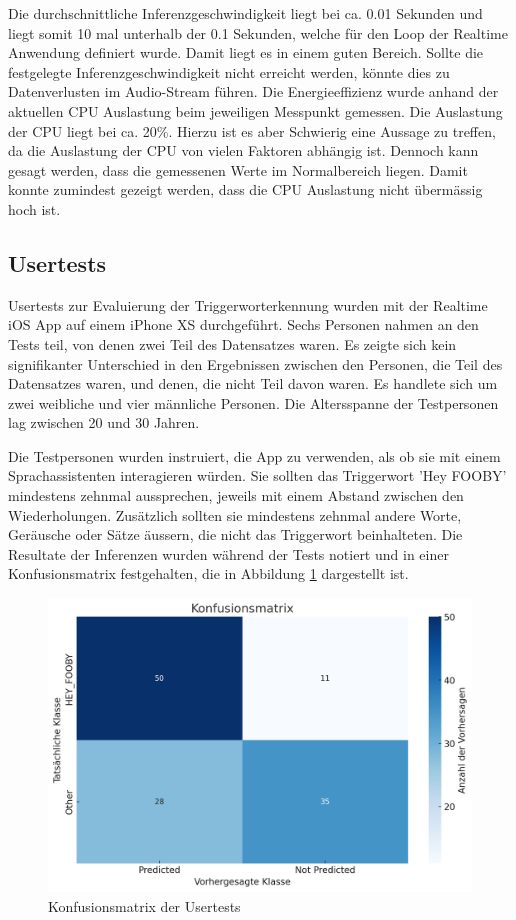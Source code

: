 \documentclass[11pt,a4paper]{article}
\begin{document}
\noindent \newline
Die durchschnittliche Inferenzgeschwindigkeit liegt bei ca. 0.01 Sekunden und liegt somit 10 mal
unterhalb der 0.1 Sekunden, welche für den Loop der Realtime Anwendung definiert wurde. Damit liegt 
es in einem guten Bereich. Sollte die festgelegte Inferenzgeschwindigkeit nicht erreicht werden, 
könnte dies zu Datenverlusten im Audio-Stream führen. Die Energieeffizienz wurde anhand der 
aktuellen CPU Auslastung beim jeweiligen Messpunkt gemessen. Die Auslastung der CPU liegt bei ca. 
20\%. Hierzu ist es aber Schwierig eine Aussage zu treffen, da die Auslastung der CPU von vielen 
Faktoren abhängig ist. Dennoch kann gesagt werden, dass die gemessenen Werte im Normalbereich 
liegen. Damit konnte zumindest gezeigt werden, dass die CPU Auslastung nicht übermässig hoch ist. 

\subsection{Usertests}
Usertests zur Evaluierung der Triggerworterkennung wurden mit der Realtime iOS App auf einem iPhone 
XS durchgeführt. Sechs Personen nahmen an den Tests teil, von denen zwei Teil des Datensatzes waren. 
Es zeigte sich kein signifikanter Unterschied in den Ergebnissen zwischen den Personen, die Teil des 
Datensatzes waren, und denen, die nicht Teil davon waren. Es handlete sich um zwei weibliche und 
vier männliche Personen. Die Altersspanne der Testpersonen lag zwischen 20 und 30 Jahren.

\noindent \newline
Die Testpersonen wurden instruiert, die App zu verwenden, als ob sie mit einem Sprachassistenten 
interagieren würden. Sie sollten das Triggerwort 'Hey FOOBY' mindestens zehnmal aussprechen, 
jeweils mit einem Abstand zwischen den Wiederholungen. Zusätzlich sollten sie mindestens zehnmal 
andere Worte, Geräusche oder Sätze äussern, die nicht das Triggerwort beinhalteten. Die Resultate 
der Inferenzen wurden während der Tests notiert und in einer Konfusionsmatrix festgehalten, die in 
Abbildung \ref{fig:usertests} dargestellt ist.

\begin{figure}[H]
	\centering
	\includegraphics[width=0.8\linewidth]{img/eval-usertests.png}
	\caption{Konfusionsmatrix der Usertests}
	\label{fig:usertests}
\end{figure}
\end{document}
